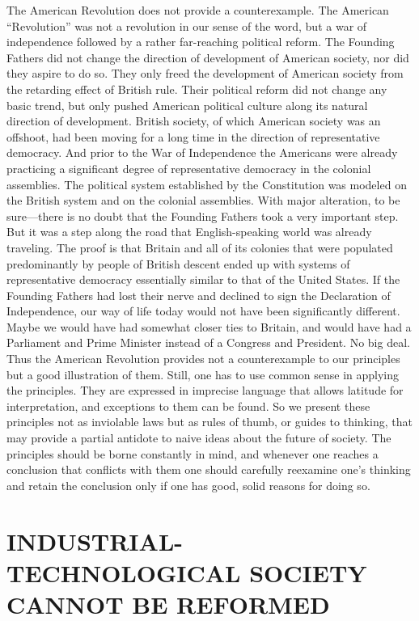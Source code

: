 { The American Revolution does not provide a counterexample. The American “Revolution” was not a revolution in our sense of the word, but a war of independence followed by a rather far-reaching political reform. The Founding Fathers did not change the direction of development of American society, nor did they aspire to do so. They only freed the development of American society from the retarding effect of British rule. Their political reform did not change any basic trend, but only pushed American political culture along its natural direction of development. British society, of which American society was an offshoot, had been moving for a long time in the direction of representative democracy. And prior to the War of Independence the Americans were already practicing a significant degree of representative democracy in the colonial assemblies. The political system established by the Constitution was modeled on the British system and on the colonial assemblies. With major alteration, to be sure—there is no doubt that the Founding Fathers took a very important step. But it was a step along the road that English-speaking world was already traveling. The proof is that Britain and all of its colonies that were populated predominantly by people of British descent ended up with systems of representative democracy essentially similar to that of the United States. If the Founding Fathers had lost their nerve and declined to sign the Declaration of Independence, our way of life today would not have been significantly different. Maybe we would have had somewhat closer ties to Britain, and would have had a Parliament and Prime Minister instead of a Congress and President. No big deal. Thus the American Revolution provides not a counterexample to our principles but a good illustration of them.
 Still, one has to use common sense in applying the principles. They are expressed in imprecise language that allows latitude for interpretation, and exceptions to them can be found. So we present these principles not as inviolable laws but as rules of thumb, or guides to thinking, that may provide a partial antidote to naive ideas about the future of society. The principles should be borne constantly in mind, and whenever one reaches a conclusion that conflicts with them one should carefully reexamine one’s thinking and retain the conclusion only if one has good, solid reasons for doing so.}

\chapter{INDUSTRIAL-TECHNOLOGICAL SOCIETY CANNOT BE REFORMED}

